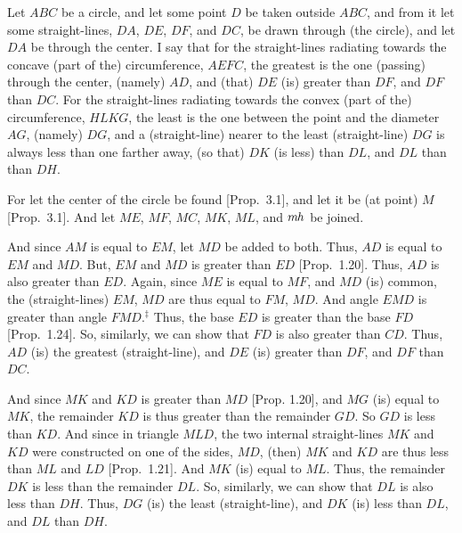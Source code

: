 \begin{Parallel}{}{}
{Let $ABC$ be a circle, and let some point $D$ be taken outside $ABC$,
and from it let some straight-lines, $DA$, $DE$, $DF$, and $DC$, be
drawn through (the circle), and let $DA$ be through the center. I say 
that for the straight-lines radiating towards the concave (part of the)
circumference, $AEFC$, the greatest is the one (passing) through the center,  (namely) $AD$,
and (that) $DE$ (is) greater than $DF$, and $DF$ than $DC$. For the straight-lines
radiating towards the convex (part of the) circumference, $HLKG$, the
least is the one between the point and the diameter $AG$, (namely) $DG$, 
and  a (straight-line) nearer to the least (straight-line) $DG$ is
always less than one farther away, (so that) $DK$ (is less) than $DL$, and $DL$ than than
$DH$.

For let the center of the circle be found [Prop.~3.1], and let it be (at point) $M$
[Prop.~3.1]. And let $ME$, $MF$, $MC$, $MK$, $ML$, and $m\kern -.7pt h$ be joined.

And since $AM$ is equal to $EM$, let $MD$ be added to both. Thus, $AD$ is equal to $EM$ and $MD$. But, $EM$ and $MD$ is greater than
$ED$ [Prop.~1.20]. Thus, $AD$ is also greater than $ED$. Again, since $ME$ is
equal to $MF$, and $MD$ (is) common, the (straight-lines) $EM$, $MD$ are thus
equal to $FM$,
$MD$. And angle $EMD$ is greater than angle $FMD$.$^\ddag$
Thus, the
base $ED$ is greater than the base $FD$ [Prop.~1.24]. 
So, similarly,
we can show that $FD$ is also greater than $CD$. Thus, $AD$ (is) the greatest
(straight-line), and $DE$ (is) greater than $DF$, and $DF$ than $DC$.

And since $MK$ and $KD$ is greater than $MD$ [Prop. 1.20], and $MG$ (is)
equal to $MK$, the remainder $KD$ is thus greater than the remainder $GD$.
So $GD$ is less than $KD$. And since in triangle $MLD$, the two internal straight-lines
$MK$ and $KD$ were constructed on one of the sides, $MD$, (then) $MK$ and $KD$
are thus less than $ML$ and $LD$  [Prop.~1.21]. And $MK$ (is) equal to $ML$.
Thus, the remainder $DK$ is less than the remainder $DL$. So, similarly, we
can show that $DL$ is also less than $DH$. Thus, $DG$ (is) the least (straight-line),
and $DK$ (is) less than $DL$, and $DL$ than $DH$.

\epsfysize=2.5in
\centerline{}

}
\end{Parallel}
